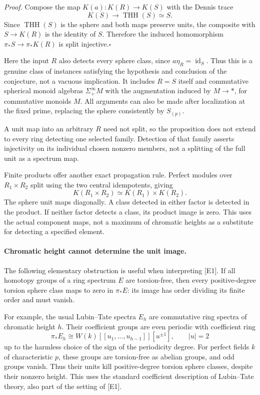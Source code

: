 \documentclass[11pt]{article}
\begin{document}
\emph{Proof.}
Compose the map $K(a):K(R)\to K(S)$ with the Dennis trace
\[
 K(S)\longrightarrow\operatorname{THH}(S)\simeq S.
\]
Since $\operatorname{THH}(S)$ is the sphere and both maps preserve
units, the composite with $S\to K(R)$ is the identity of $S$.
Therefore the induced homomorphism $\pi_*S\to\pi_*K(R)$ is split
injective.\hfill$\square$

Here the input $R$ also detects every sphere class, since
$a\eta_R=\operatorname{id}_S$. Thus this is a genuine class of
instances satisfying the hypothesis and conclusion of the conjecture,
not a vacuous implication. It includes $R=S$ itself and commutative
spherical monoid algebras $\Sigma^\infty_+M$ with the augmentation
induced by $M\to *$, for commutative monoids $M$. All arguments can
also be made after localization at the fixed prime, replacing the
sphere consistently by $S_{(p)}$.

A unit map into an arbitrary $R$ need not split, so the proposition
does not extend to every ring detecting one selected family. Detection
of that family asserts injectivity on its individual chosen nonzero
members, not a splitting of the full unit as a spectrum map.

Finite products offer another exact propagation rule. Perfect modules
over $R_1\times R_2$ split using the two central idempotents, giving
\[
 K(R_1\times R_2)\simeq K(R_1)\times K(R_2).
\]
The sphere unit maps diagonally. A class detected in either factor is
detected in the product. If neither factor detects a class, its product
image is zero. This uses the actual component maps, not a maximum of
chromatic heights as a substitute for detecting a specified element.

\paragraph{Chromatic height cannot determine the unit image.}
The following elementary obstruction is useful when interpreting [E1].
If all homotopy groups of a ring spectrum $E$ are torsion-free, then
every positive-degree torsion sphere class maps to zero in $\pi_*E$:
its image has order dividing its finite order and must vanish.

For example, the usual Lubin--Tate spectra $E_h$ are commutative ring
spectra of chromatic height $h$. Their coefficient groups are even
periodic with coefficient ring
\[
 \pi_*E_h\cong W(k)[[u_1,\ldots,u_{h-1}]][u^{\pm1}],\qquad |u|=2
\]
up to the harmless choice of the sign of the periodicity degree.
For perfect fields $k$ of characteristic $p$, these groups are
torsion-free as abelian groups, and odd groups vanish. Thus their
units kill positive-degree torsion sphere classes, despite their
nonzero height. This uses the standard coefficient description of
Lubin--Tate theory, also part of the setting of [E1].
\end{document}
